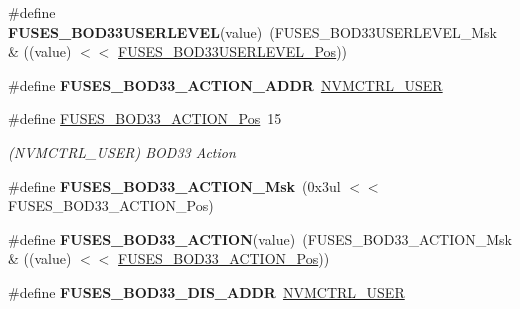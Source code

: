 \begin{DoxyCompactItemize}
\item 
\hypertarget{group__fuses__api_ga8cc7a1bcf2ec2f7486235c9ae5c40c18}{}\#define {\bfseries F\+U\+S\+E\+S\+\_\+\+B\+O\+D33\+U\+S\+E\+R\+L\+E\+V\+E\+L}(value)~(F\+U\+S\+E\+S\+\_\+\+B\+O\+D33\+U\+S\+E\+R\+L\+E\+V\+E\+L\+\_\+\+Msk \& ((value) $<$$<$ \hyperlink{group__fuses__api_ga9e8109cd0996312419933645a2f2a089}{F\+U\+S\+E\+S\+\_\+\+B\+O\+D33\+U\+S\+E\+R\+L\+E\+V\+E\+L\+\_\+\+Pos}))\label{group__fuses__api_ga8cc7a1bcf2ec2f7486235c9ae5c40c18}

\item 
\hypertarget{group__fuses__api_ga569f05e870ad0d72456c8e15c3b1c148}{}\#define {\bfseries F\+U\+S\+E\+S\+\_\+\+B\+O\+D33\+\_\+\+A\+C\+T\+I\+O\+N\+\_\+\+A\+D\+D\+R}~\hyperlink{group___s_a_m_l21_j18_a__base_ga7a7a83a5753fa323b61536e396083c99}{N\+V\+M\+C\+T\+R\+L\+\_\+\+U\+S\+E\+R}\label{group__fuses__api_ga569f05e870ad0d72456c8e15c3b1c148}

\item 
\hypertarget{group__fuses__api_gaac742323e1fa3072afa8ce20817c58f3}{}\#define \hyperlink{group__fuses__api_gaac742323e1fa3072afa8ce20817c58f3}{F\+U\+S\+E\+S\+\_\+\+B\+O\+D33\+\_\+\+A\+C\+T\+I\+O\+N\+\_\+\+Pos}~15\label{group__fuses__api_gaac742323e1fa3072afa8ce20817c58f3}

\begin{DoxyCompactList}\small\item\em (N\+V\+M\+C\+T\+R\+L\+\_\+\+U\+S\+E\+R) B\+O\+D33 Action \end{DoxyCompactList}\item 
\hypertarget{group__fuses__api_ga732fae9ecd483358a62bd56dc3e0a71b}{}\#define {\bfseries F\+U\+S\+E\+S\+\_\+\+B\+O\+D33\+\_\+\+A\+C\+T\+I\+O\+N\+\_\+\+Msk}~(0x3ul $<$$<$ F\+U\+S\+E\+S\+\_\+\+B\+O\+D33\+\_\+\+A\+C\+T\+I\+O\+N\+\_\+\+Pos)\label{group__fuses__api_ga732fae9ecd483358a62bd56dc3e0a71b}

\item 
\hypertarget{group__fuses__api_gaceb879a4bc8e1843e2553cb0c22ccfb9}{}\#define {\bfseries F\+U\+S\+E\+S\+\_\+\+B\+O\+D33\+\_\+\+A\+C\+T\+I\+O\+N}(value)~(F\+U\+S\+E\+S\+\_\+\+B\+O\+D33\+\_\+\+A\+C\+T\+I\+O\+N\+\_\+\+Msk \& ((value) $<$$<$ \hyperlink{group__fuses__api_gaac742323e1fa3072afa8ce20817c58f3}{F\+U\+S\+E\+S\+\_\+\+B\+O\+D33\+\_\+\+A\+C\+T\+I\+O\+N\+\_\+\+Pos}))\label{group__fuses__api_gaceb879a4bc8e1843e2553cb0c22ccfb9}

\item 
\hypertarget{group__fuses__api_ga367964d2665efad4499fd2ff20d85539}{}\#define {\bfseries F\+U\+S\+E\+S\+\_\+\+B\+O\+D33\+\_\+\+D\+I\+S\+\_\+\+A\+D\+D\+R}~\hyperlink{group___s_a_m_l21_j18_a__base_ga7a7a83a5753fa323b61536e396083c99}{N\+V\+M\+C\+T\+R\+L\+\_\+\+U\+S\+E\+R}\label{group__fuses__api_ga367964d2665efad4499fd2ff20d85539}


\end{DoxyCompactItemize}
